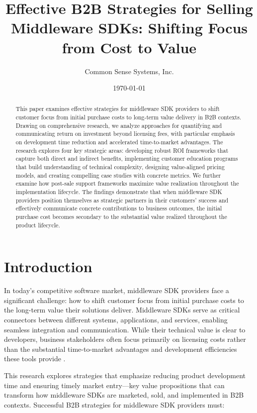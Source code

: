 \documentclass[11pt,a4paper]{article}
\title{\LARGE\textbf{Effective B2B Strategies for Selling Middleware SDKs: Shifting Focus from Cost to Value}}
\author{Common Sense Systems, Inc.}
\date{\today}
\begin{document}
\maketitle
\thispagestyle{fancy}

\begin{abstract}
This paper examines effective strategies for middleware SDK providers to shift customer focus from initial purchase costs to long-term value delivery in B2B contexts. Drawing on comprehensive research, we analyze approaches for quantifying and communicating return on investment beyond licensing fees, with particular emphasis on development time reduction and accelerated time-to-market advantages. The research explores four key strategic areas: developing robust ROI frameworks that capture both direct and indirect benefits, implementing customer education programs that build understanding of technical complexity, designing value-aligned pricing models, and creating compelling case studies with concrete metrics. We further examine how post-sale support frameworks maximize value realization throughout the implementation lifecycle. The findings demonstrate that when middleware SDK providers position themselves as strategic partners in their customers' success and effectively communicate concrete contributions to business outcomes, the initial purchase cost becomes secondary to the substantial value realized throughout the product lifecycle.
\end{abstract}

\tableofcontents
\newpage

\section{Introduction}

In today's competitive software market, middleware SDK providers face a significant challenge: how to shift customer focus from initial purchase costs to the long-term value their solutions deliver. Middleware SDKs serve as critical connectors between different systems, applications, and services, enabling seamless integration and communication. While their technical value is clear to developers, business stakeholders often focus primarily on licensing costs rather than the substantial time-to-market advantages and development efficiencies these tools provide \citep{tradecentric2023}.

This research explores strategies that emphasize reducing product development time and ensuring timely market entry—key value propositions that can transform how middleware SDKs are marketed, sold, and implemented in B2B contexts. Successful B2B strategies for middleware SDK providers must:
\end{document}
